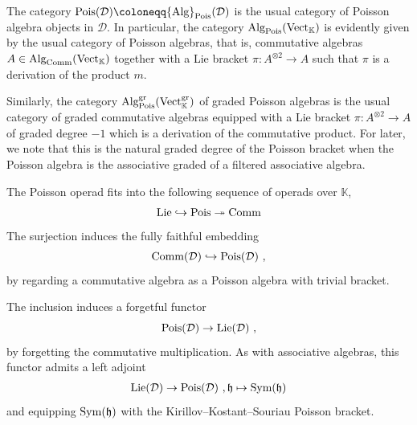 \documentclass[11pt]{amsart}
\numberwithin{equation}{section}
\theoremstyle{definition}
\newtheorem{rmk}[theo]{Remark}
\newcommand{\bb}{\mathbb}
\newcommand{\mf}{\mathfrak}
\newcommand{\D}{{\mathcal{D}}}
\DeclareMathOperator{\Vect}{Vect}
\newcommand{\K}{{\bb K}}
\newcommand{\ik}{{\bb K}}
\newcommand{\Ind}{{\textup{Ind}}}
\newcommand{\Alg}{{\textup{Alg}}}
\newcommand{\Pois}{{\textup{Pois}}}
\newcommand{\Comm}{{\textup{Comm}}}
\newcommand{\Lie}{{\textup{Lie}}}
\newcommand{\Ass}{{\textup{Ass}}}
\newcommand{\Ss}{{{\mf{S}}}}
\newcommand{\0}{{\textbf{0}}}
\newcommand{\Sym}{\textup{Sym}}
\newcommand{\id}{{\textup{id}}}
\newcommand{\gr}{\textup{gr}}
\def\hf{\mathfrak{h}}
\def \mf{\mathfrak}
\def \id{\mathbbm{1}}
\newcommand{\tensor}[1]{\underset{#1}{\otimes}}
\begin{document}
The category $\Pois(\D)\coloneqq \Alg_{\Pois}(\D)$ is the usual category of Poisson algebra objects in $\D$. In particular, the category $\Alg_{\Pois}(\Vect_\K)$ is evidently given by the usual category of Poisson algebras, that is, commutative algebras $A\in \Alg_\Comm(\Vect_\K)$ together with a Lie bracket $\pi: A^{\otimes 2}\to A$ such that $\pi$ is a derivation of the product $m$. 

Similarly, the category $\Alg^\gr_{\Pois}(\Vect_\ik^\gr)$ of graded Poisson algebras is the usual category of graded commutative algebras equipped with a Lie bracket $\pi: A^{\otimes 2}\to A$ of graded degree $-1$ which is a derivation of the commutative product. For later, we note that this is the natural graded degree of the Poisson bracket when the Poisson algebra is the associative graded of a filtered associative algebra.






The Poisson operad fits into the following sequence of operads over $\ik$,
\begin{align*}
	\Lie \hookrightarrow \Pois \twoheadrightarrow \Comm
\end{align*}
The surjection induces the fully faithful embedding
\[
\Comm(\D)\hookrightarrow \Pois(\D)~,
\]
by regarding a commutative algebra as a Poisson algebra with trivial bracket.

The inclusion induces a forgetful functor
\[
\Pois(\D) \rightarrow \Lie(\D)~,
\]
by forgetting the commutative multiplication. As with associative algebras, this functor admits a left adjoint 
\begin{align*}
	\Lie(\D)\rightarrow \Pois(\D)~,
	\hf\mapsto \Sym(\hf)
\end{align*}
and equipping $\Sym(\hf)$ with the Kirillov--Kostant--Souriau Poisson bracket.
\end{document}
